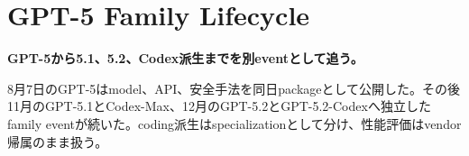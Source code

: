 \section{GPT-5 Family Lifecycle}
\label{pkg:model}
\noindent\textbf{GPT-5から5.1、5.2、Codex派生までを別eventとして追う。}\autocite{src-05738f6c55b7,src-964121647555,src-aec54e92a7f3}

8月7日のGPT-5はmodel、API、安全手法を同日packageとして公開した。その後11月のGPT-5.1とCodex-Max、12月のGPT-5.2とGPT-5.2-Codexへ独立したfamily eventが続いた。coding派生はspecializationとして分け、性能評価はvendor帰属のまま扱う。\autocite{src-05738f6c55b7,src-10ab1c39be14,src-55da04f42e32,src-5bea303cfdb1,src-964121647555,src-aec54e92a7f3,src-cd8d6c8023f2}
